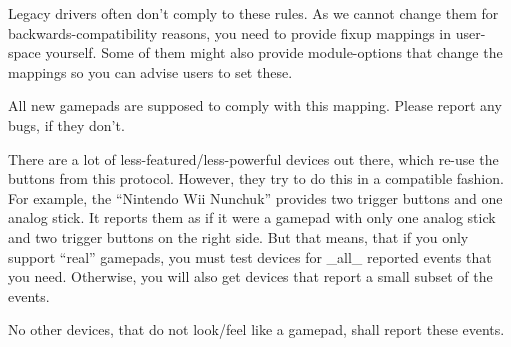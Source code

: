 \documentclass[a4paper,8pt,english]{sphinxmanual}
\begin{document}
Legacy drivers often don't comply to these rules. As we cannot change them
for backwards-compatibility reasons, you need to provide fixup mappings in
user-space yourself. Some of them might also provide module-options that
change the mappings so you can advise users to set these.

All new gamepads are supposed to comply with this mapping. Please report any
bugs, if they don't.

There are a lot of less-featured/less-powerful devices out there, which re-use
the buttons from this protocol. However, they try to do this in a compatible
fashion. For example, the ``Nintendo Wii Nunchuk'' provides two trigger buttons
and one analog stick. It reports them as if it were a gamepad with only one
analog stick and two trigger buttons on the right side.
But that means, that if you only support ``real'' gamepads, you must test
devices for \_all\_ reported events that you need. Otherwise, you will also get
devices that report a small subset of the events.

No other devices, that do not look/feel like a gamepad, shall report these
events.
\end{document}
